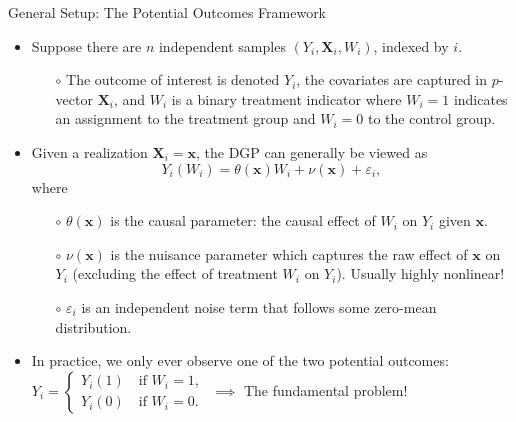 \documentclass[11pt]{beamer}
\begin{document}
\begin{frame}{General Setup: The Potential Outcomes Framework}
	\begin{itemize}
		\item Suppose there are $n$ independent samples $( Y_i, \mathbf{X}_i, W_i)$, indexed by $i$. 
		\begin{itemize}
		\item[$\circ$] The outcome of interest is denoted $Y_i$, the covariates are captured in $p$-vector $\mathbf{X}_i$, and $W_i$ is a binary treatment indicator where $W_i=1$ indicates an assignment to the treatment group and $W_i=0$ to the control group.
		\end{itemize}
	\item Given a realization $\mathbf{X}_i = \mathbf{x}$, the DGP can generally be viewed as
	\[ 
		Y_i(W_i) = \theta(\mathbf{x}) W_i + \nu(\mathbf{x}) + \varepsilon_i,
	\]
	where
	\begin{itemize}
		\item[$\circ$] $\theta(\mathbf{x})$ is the \alert{causal parameter}: the causal effect of $W_i$ on $Y_i$ given $\mathbf{x}$.
		\item[$\circ$] $\nu(\mathbf{x})$ is the \alert{nuisance parameter} which captures the raw effect of $\mathbf{x}$ on $Y_i$ (excluding the effect of treatment $W_i$ on $Y_i$). Usually highly nonlinear!
		\item[$\circ$] $\varepsilon_i$ is an independent noise term that follows some zero-mean distribution.
	\end{itemize}
	\item In practice, we only ever observe one of the two potential outcomes: 
	$Y_i = 
	\begin{cases}
	 Y_i(1) \quad \text{if } W_i=1,\\
	 Y_i(0) \quad \text{if } W_i=0. 
	 \end{cases}$
	 $\implies$ \alert{The fundamental problem!}
	\end{itemize}
\end{frame}
\end{document}
